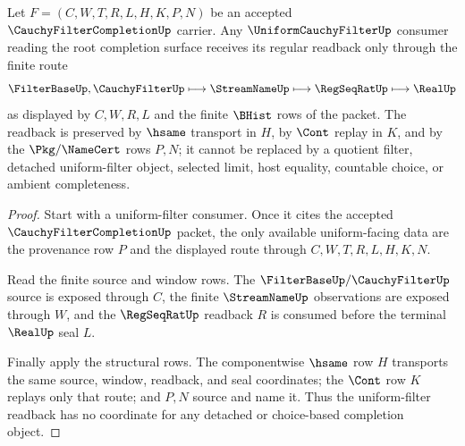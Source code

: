\begin{theorem}
\label{thm:cauchy-filter-completion-root-uniform-filter-readback}
Let $F=(C,W,T,R,L,H,K,P,N)$ be an accepted $\CauchyFilterCompletionUp$ carrier. Any $\UniformCauchyFilterUp$ consumer reading the root completion surface receives its regular readback only through the finite route
$$
\FilterBaseUp,\CauchyFilterUp \longmapsto \StreamNameUp \longmapsto \RegSeqRatUp \longmapsto \RealUp
$$
as displayed by $C,W,R,L$ and the finite $\BHist$ rows of the packet. The readback is preserved by $\hsame$ transport in $H$, by $\Cont$ replay in $K$, and by the $\Pkg/\NameCert$ rows $P,N$; it cannot be replaced by a quotient filter, detached uniform-filter object, selected limit, host equality, countable choice, or ambient completeness.
\end{theorem}
\begin{proof}
Start with a uniform-filter consumer. Once it cites the accepted $\CauchyFilterCompletionUp$ packet, the only available uniform-facing data are the provenance row $P$ and the displayed route through $C,W,T,R,L,H,K,N$.

Read the finite source and window rows. The $\FilterBaseUp/\CauchyFilterUp$ source is exposed through $C$, the finite $\StreamNameUp$ observations are exposed through $W$, and the $\RegSeqRatUp$ readback $R$ is consumed before the terminal $\RealUp$ seal $L$.

Finally apply the structural rows. The componentwise $\hsame$ row $H$ transports the same source, window, readback, and seal coordinates; the $\Cont$ row $K$ replays only that route; and $P,N$ source and name it. Thus the uniform-filter readback has no coordinate for any detached or choice-based completion object.
\end{proof}

